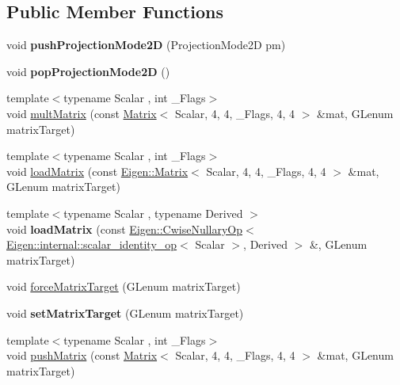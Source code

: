 \subsection*{Public Member Functions}
\begin{DoxyCompactItemize}
\item 
\mbox{\label{class_gpu_helper_a101d705149a820494268ae84b6a5be3a}} 
void {\bfseries push\+Projection\+Mode2D} (Projection\+Mode2D pm)
\item 
\mbox{\label{class_gpu_helper_a1d4fb48533179c50f92123fd9df47d91}} 
void {\bfseries pop\+Projection\+Mode2D} ()
\item 
{\footnotesize template$<$typename Scalar , int \+\_\+\+Flags$>$ }\\void \hyperlink{class_gpu_helper_a3abb45392e7dcf6450fa94bd345d9096}{mult\+Matrix} (const \hyperlink{group___core___module_class_eigen_1_1_matrix}{Matrix}$<$ Scalar, 4, 4, \+\_\+\+Flags, 4, 4 $>$ \&mat, G\+Lenum matrix\+Target)
\item 
{\footnotesize template$<$typename Scalar , int \+\_\+\+Flags$>$ }\\void \hyperlink{class_gpu_helper_a31ac77373dc54409648558d79d5a8c3e}{load\+Matrix} (const \hyperlink{group___core___module_class_eigen_1_1_matrix}{Eigen\+::\+Matrix}$<$ Scalar, 4, 4, \+\_\+\+Flags, 4, 4 $>$ \&mat, G\+Lenum matrix\+Target)
\item 
\mbox{\label{class_gpu_helper_aa24d37715f29da09e4e970cfa4f1f1e7}} 
{\footnotesize template$<$typename Scalar , typename Derived $>$ }\\void {\bfseries load\+Matrix} (const \hyperlink{group___core___module_class_eigen_1_1_cwise_nullary_op}{Eigen\+::\+Cwise\+Nullary\+Op}$<$ \hyperlink{struct_eigen_1_1internal_1_1scalar__identity__op}{Eigen\+::internal\+::scalar\+\_\+identity\+\_\+op}$<$ Scalar $>$, Derived $>$ \&, G\+Lenum matrix\+Target)
\item 
void \hyperlink{class_gpu_helper_a52a9ab12d07acbf4ad80737595a9b06e}{force\+Matrix\+Target} (G\+Lenum matrix\+Target)
\item 
\mbox{\label{class_gpu_helper_a310cd4e00d7e8b63771391da3a62943e}} 
void {\bfseries set\+Matrix\+Target} (G\+Lenum matrix\+Target)
\item 
{\footnotesize template$<$typename Scalar , int \+\_\+\+Flags$>$ }\\void \hyperlink{class_gpu_helper_ac51c8b669a80ca6e4338c87136fb991e}{push\+Matrix} (const \hyperlink{group___core___module_class_eigen_1_1_matrix}{Matrix}$<$ Scalar, 4, 4, \+\_\+\+Flags, 4, 4 $>$ \&mat, G\+Lenum matrix\+Target)

\end{DoxyCompactItemize}
